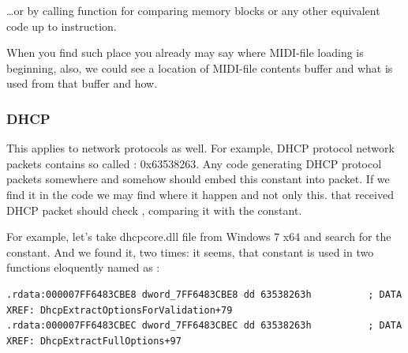 {\dots or by calling function for comparing memory blocks  or any other equivalent code
up to  instruction.}

{When you find such place you already may say where MIDI-file loading is beginning, also, we could see a location
of MIDI-file contents buffer and what is used from that buffer and how.}

\subsubsection{DHCP}

{This applies to network protocols as well.
For example, DHCP protocol network packets contains so called : 0x63538263.
Any code generating DHCP protocol packets somewhere and somehow should embed this constant into packet.
If we find it in the code we may find where it happen and not only this.
 that received DHCP packet should check , comparing it with the constant.}

{For example, let's take dhcpcore.dll file from Windows 7 x64 and search for the constant.
And we found it, two times: it seems, that constant is used in two functions eloquently 
named as}   :

\begin{lstlisting}[caption=dhcpcore.dll (Windows 7 x64)]
.rdata:000007FF6483CBE8 dword_7FF6483CBE8 dd 63538263h          ; DATA XREF: DhcpExtractOptionsForValidation+79
.rdata:000007FF6483CBEC dword_7FF6483CBEC dd 63538263h          ; DATA XREF: DhcpExtractFullOptions+97
\end{lstlisting}

